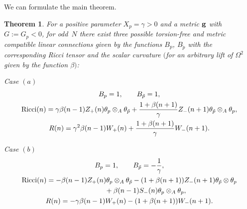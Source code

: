 \documentclass[pdftex]{sigma}
\numberwithin{equation}{section}
\newtheorem{Theorem}{Theorem}[section]
\newcommand{\ip}{{\tilde{p}}}
\begin{document}
We can formulate the main theorem.
\begin{Theorem}
\label{positive_curvature}
For a positive parameter $X_p=\gamma>0$ and a metric ${\bf g}$ with $G:=G_p < 0$, for odd~$N$ there exist three possible torsion-free and metric compatible linear connections given by the functions $B_p$, $B_\ip$ with the corresponding Ricci tensor and the scalar curvature $($for an arbitrary lift of $\Omega^2$ given by the function $\beta)$:

Case $(a)$
\begin{gather*}
 B_p=1,\qquad B_\ip=1, \\
{\rm Ricci}(n) = \gamma \beta(n-1) Z_+(n) \theta_p \otimes_A \theta_\ip + \frac{1+\beta(n+1)}{\gamma} Z_-(n+1) \theta_\ip \otimes_A \theta_p, \\
 R(n) = \gamma^2 \beta(n-1) W_+(n) +\frac{1+\beta(n+1)}{\gamma} W_-(n+1).
\end{gather*}

Case $(b)$
\begin{gather*}
B_p=1, \qquad B_\ip=-\frac{1}{\gamma}, \\
{\rm Ricci}(n) = -\beta(n-1)Z_+(n)\theta_p\otimes_A\theta_\ip-(1+\beta(n+1))Z_-(n+1)\theta_\ip\otimes\theta_p\\
\hphantom{{\rm Ricci}(n) =}{} +\beta(n-1)S_-(n)\theta_p\otimes_A\theta_p,\\
 R(n) = -\gamma\beta(n-1)W_+(n)-(1+\beta(n+1))W_-(n+1).
\end{gather*}


\end{Theorem}
\end{document}
